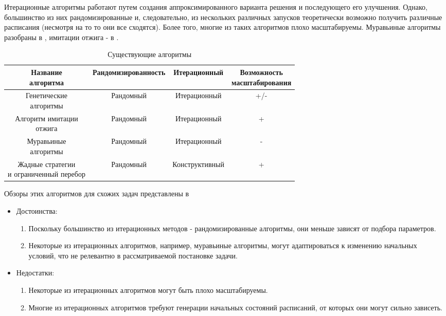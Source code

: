 Итерационные алгоритмы работают путем создания аппроксимированного варианта решения и последующего его улучшения. Однако, большинство из них рандомизированные и, следовательно, из нескольких различных запусков теоретически возможно получить различные расписания (несмотря на то то они все сходятся). Более того, многие из таких алгоритмов плохо масштабируемы. Муравьиные алгоритмы разобраны в \cite{Shtovba_2005}, имитации отжига - в \cite{Kirkpatrick_1983}.
\begin{table}[H]
    \caption{Существующие алгоритмы}
    \begin{tabular}{ c | c | c | c  }
        \makecell{Название          \\алгоритма} & Рандомизированность & Итерационный & \makecell{Возможность \\ масштабирования} \\
        \hline
        \makecell{Генетические      \\алгоритмы} & Рандомный & Итерационный & +/- \\
        \makecell{Алгоритм имитации \\отжига} & Рандомный & Итерационный & + \\
        \makecell{Муравьиные        \\алгоритмы} & Рандомный & Итерационный & - \\
        \makecell{Жадные стратегии  \\и ограниченный перебор} & Рандомный & Конструктивный & + \\
    \end{tabular}

\end{table}

Обзоры этих алгоритмов для схожих задач представлены в \cite{Coffman,Davis_2011,Shakhbazyan_1981}

\begin{itemize}
    \item Достоинства:
          \begin{enumerate}
              \item Поскольку большинство из итерационных методов - рандомизированные алгоритмы, они меньше зависят от подбора параметров.
              \item Некоторые из итерационных алгоритмов, например, муравьиные алгоритмы, могут адаптироваться к изменению начальных условий, что не релевантно в рассматриваемой постановке задачи.
          \end{enumerate}
    \item Недостатки:
          \begin{enumerate}
              \item Некоторые из итерационных алгоритмов могут быть плохо масштабируемы. 
              \item Многие из итерационных алгоритмов требуют генерации начальных состояний расписаний, от которых они могут сильно зависеть.
          \end{enumerate}
\end{itemize}
